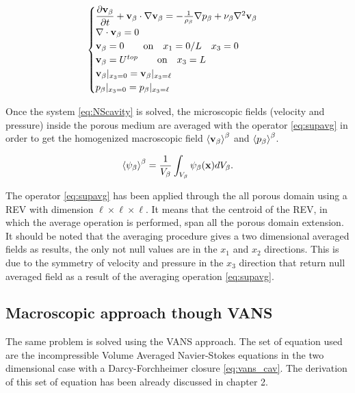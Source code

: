\begin{eqnarray}
\begin{cases}
\dfrac{\partial \textbf{v}_{\beta}}{\partial t} + \textbf{v}_{\beta} \cdot \nabla \textbf{v}_{\beta} = -\frac{1}{\rho_{\beta}} \nabla p_{\beta} + \nu_{\beta} \nabla^2  \textbf{v}_{\beta} \\
\nabla \cdot \textbf{v}_{\beta} = 0\\
\textbf{v}_{\beta} = 0 \qquad \text{on} \quad x_1 = 0/L \quad x_3 = 0 \\
\textbf{v}_{\beta} = U^{top} \qquad \text{on} \quad x_3 = L\\
\textbf{v}_{\beta}|_{x_3 = 0} = \textbf{v}_{\beta}|_{x_3 = \ell}  \\
p_{\beta}|_{x_3 = 0} = p_{\beta}|_{x_3 = \ell}
\end{cases}
\label{eq:NScavity}
\end{eqnarray}

Once the system \eqref{eq:NScavity} is solved, the microscopic fields (velocity and pressure) inside the porous medium are averaged with the operator \ref{eq:supavg} in order to get the homogenized macroscopic field ${\left< \textbf{v}_{\beta} \right>}^{\beta}$ and ${\left< p_{\beta} \right>}^{\beta}$.

\begin{equation}
	{\left< \psi_{\beta} \right>}^{\beta} = \dfrac{1}{V_\beta} \int_{V_\beta} \psi_\beta (\mathbf{x}) d V_\beta.
	\label{eq:supavg}
\end{equation}

The operator \eqref{eq:supavg} has been applied through the all porous domain using a REV with dimension $\ell \times \ell \times \ell$.
It means that the centroid of the REV, in which the average operation is performed, span all the porous domain extension.
It should be noted that the averaging procedure gives a two dimensional averaged fields as results, the only not null values are in the $x_1$ and $x_2$ directions. This is due to the symmetry of velocity and pressure in the $x_3$ direction that return null averaged field as a result of the averaging operation \eqref{eq:supavg}.

\subsection{Macroscopic approach though VANS}

The same problem is solved using the VANS approach.
The set of equation used are the incompressible Volume Averaged Navier-Stokes equations in the two dimensional case with a Darcy-Forchheimer closure \eqref{eq:vans_cav}.
The derivation of this set of equation has been already discussed in chapter 2.

